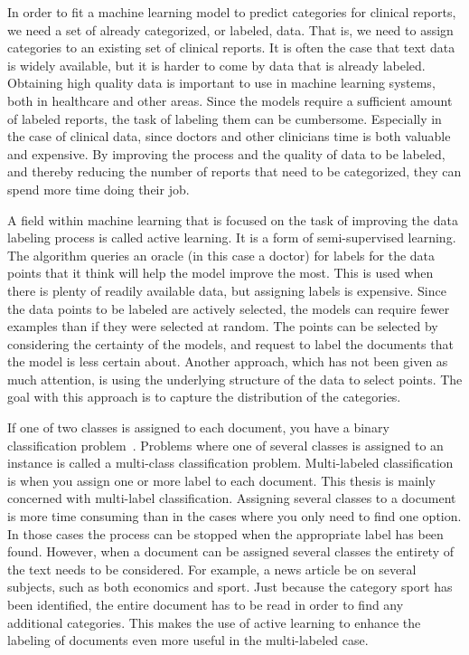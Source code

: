 In order to fit a machine learning model to predict categories for clinical reports, we need a set of already categorized, or labeled, data.
That is, we need to assign categories to an existing set of clinical reports.
It is often the case that text data is widely available, but it is harder to come by data that is already labeled.
Obtaining high quality data is important to use in machine learning systems, both in healthcare and other areas.
Since the models require a sufficient amount of labeled reports, the task of labeling them can be cumbersome.
Especially in the case of clinical data, since doctors and other clinicians time is both valuable and expensive.
By improving the process and the quality of data to be labeled, and thereby reducing the number of reports that need to be categorized, they can spend more time doing their job.

A field within machine learning that is focused on the task of improving the data labeling process is called active learning.
It is a form of semi-supervised learning.
The algorithm queries an oracle (in this case a doctor) for labels for the data points that it think will help the model improve the most.
This is used when there is plenty of readily available data, but assigning labels is expensive.
Since the data points to be labeled are actively selected, the models can require fewer examples than if they were selected at random.
The points can be selected by considering the certainty of the models, and request to label the documents that the model is less certain about.
Another approach, which has not been given as much attention, is using the underlying structure of the data to select points.
The goal with this approach is to capture the distribution of the categories.

If one of two classes is assigned to each document, you have a binary classification problem~\cite{bishop2006pattern}.
Problems where one of several classes is assigned to an instance is called a multi-class classification problem.
Multi-labeled classification is when you assign one or more label to each document.
This thesis is mainly concerned with multi-label classification.
Assigning several classes to a document is more time consuming than in the cases where you only need to find one option.
In those cases the process can be stopped when the appropriate label has been found.
However, when a document can be assigned several classes the entirety of the text needs to be considered.
For example, a news article be on several subjects, such as both economics and sport.
Just because the category sport has been identified, the entire document has to be read in order to find any additional categories.
This makes the use of active learning to enhance the labeling of documents even more useful in the multi-labeled case.  

